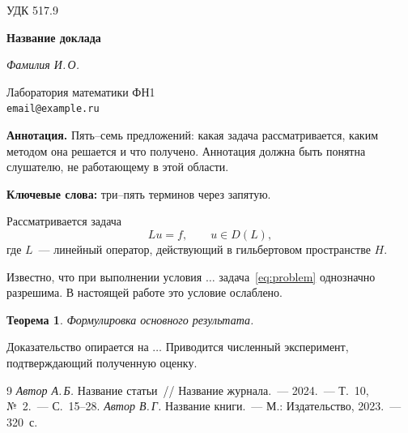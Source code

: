 \documentclass[12pt, a4paper]{article}
\theoremstyle{plain}
\newtheorem{theorem}{Теорема}
\begin{document}
\noindent УДК 517.9

\begin{center}
  {\large\bfseries Название доклада}

  \vspace{0.4em}

  \textit{Фамилия И.\,О.}

  \vspace{0.2em}

  {\small Лаборатория математики ФН1\\
  \texttt{email@example.ru}}
\end{center}

\vspace{0.8em}

\noindent\textbf{Аннотация.} Пять--семь предложений: какая задача рассматривается,
каким методом она решается и что получено. Аннотация должна быть понятна
слушателю, не работающему в этой области.

\vspace{0.5em}

\noindent\textbf{Ключевые слова:} три--пять терминов через запятую.

\vspace{1em}

Рассматривается задача
\begin{equation}\label{eq:problem}
  L u = f, \qquad u \in D(L),
\end{equation}
где $L$~--- линейный оператор, действующий в гильбертовом пространстве $H$.

Известно, что при выполнении условия $\ldots$ задача~\eqref{eq:problem}
однозначно разрешима. В настоящей работе это условие ослаблено.

\begin{theorem}
  Формулировка основного результата.
\end{theorem}

Доказательство опирается на $\ldots$ Приводится численный эксперимент,
подтверждающий полученную оценку.

\vspace{1em}

\begin{thebibliography}{9}
  \footnotesize
   \emph{Автор А.\,Б.} Название статьи~// Название журнала.~---
    2024.~--- Т.~10, №~2.~--- С.~15--28.
   \emph{Автор В.\,Г.} Название книги.~--- М.: Издательство, 2023.~--- 320~с.
\end{thebibliography}
\end{document}
